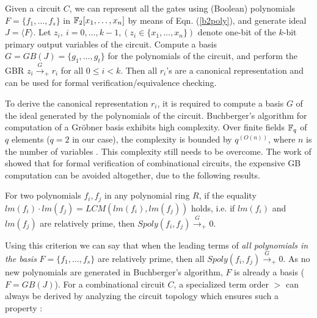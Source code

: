 \begin{Proposition}\label{prop:verif}
Given a circuit $C$, we can represent all the gates using (Boolean)
polynomials $F = \{f_1, \dots, f_s\}$ in ${\mathbb{F}}_2[x_1,\dots,x_n]$ by
means of Eqn. (\ref{b2poly}), and generate ideal $J  = \langle F \rangle$. Let
$z_i, ~i = 0,\dots,{k-1}, (z_i \in \{x_1,\dots,x_n\})$ denote one-bit of the
$k$-bit primary output variables   
of the circuit.  Compute a \Grobner basis $G = GB(J) =
\{g_1,\dots,g_t\}$ for the polynomials of the circuit, and perform the
GBR $z_i\xrightarrow{G}_+ r_i$ for all $0\leq i<k$. Then all $r_i$'s
are a canonical representation and can be used for formal
verification/equivalence checking. 
\end{Proposition}

To derive the canonical representation $r_i$, it is required to
compute a \Grobner basis $G$ of the ideal generated by the polynomials
of the circuit. Buchberger's algorithm for computation of a Gr\"obner
basis exhibits high complexity. 
Over finite fields ${\mathbb{F}}_{q}$ of $q$ elements ($q =
2$ in our case), the complexity is bounded by $q^{(O(n))}$, where $n$
is the number of variables \cite{gao:gf-gb-ms}. This complexity still
needs to be overcome. The work of \cite{lv:tcad2013} showed that for
formal verification of combinational circuits, the expensive GB
computation can be avoided altogether, due to the following results. 

\begin{Lemma}
\label{prod_criteria}
For two polynomials $f_i,f_j$  in any polynomial ring $R$, if the
equality $lm(f_i)\cdot lm(f_j) = LCM(lm(f_i),lm(f_j))$ holds, i.e. if
$lm(f_i)$ and $lm(f_j)$ are relatively prime, then 
$Spoly(f_i,f_j) \xrightarrow{G}_+ 0$.  
\end{Lemma}
 

Using this criterion we can say that when the leading terms of {\it all
polynomials in the basis} $F = \{f_1, \dots, f_s\}$ are relatively
prime, then all $Spoly(f_i,f_j)  \xrightarrow{G}_+ 0$.  As no new
polynomials are generated in Buchberger's algorithm, $F$ is already a
\Grobner basis ($F = GB(J)$). For a combinational
circuit $C$, a specialized term order $>$ can always be derived by
analyzing the circuit topology which ensures such a property
\cite{wienand:cav08} \cite{lv:tcad2013}:  

